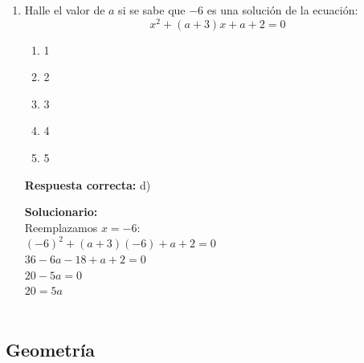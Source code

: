 \begin{enumerate}
\begin{center}
		\end{center}
		
		$CS = \langle -\infty, 1 ] \cup \langle 2, +\infty \rangle$ \\
		\fbox{$\equiv \mathbb{R} - \langle 1, 2 ]$}

	
	\vspace{6mm}
	
	\item Halle el valor de $a$ si se sabe que $-6$ es una solución de la ecuación:
	\[ x^2 + (a+3)x + a+2 = 0 \]
	
	\begin{enumerate}[label=\alph*)]
		\item 1
		\item 2
		\item 3
		\item 4
		\item 5
	\end{enumerate}
	\textbf{Respuesta correcta:} d)
	
	\vspace{2mm}
	\textbf{Solucionario:}\\
	Reemplazamos $x = -6$:\\
	$ (-6)^2 + (a+3)(-6) + a+2 = 0 $\\
	$ 36 - 6a - 18 + a + 2 = 0 $\\
	$ 20 - 5a = 0 $\\
	$ 20 = 5a $\\
	\\
	
	\vspace{6mm}
	
\end{enumerate}




\subsection*{Geometría}

